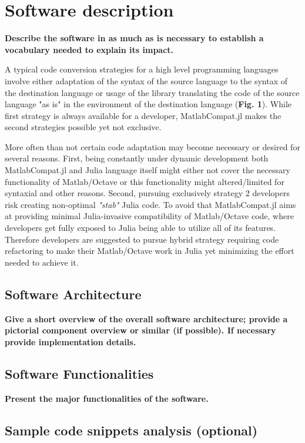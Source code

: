 \section{Software description}
\label{} 

\textbf{Describe the software in as much as is necessary to establish a vocabulary needed to explain its impact. }

A typical code conversion strategies for a high level programming languages involve either adaptation of the syntax of the source language to the syntax of the destination language or usage of the library translating the code of the source language "as is" in the environment of the destination language (\textbf{Fig. 1}). While first strategy is always available for a developer, MatlabCompat.jl makes the second strategies possible yet not exclusive.

More often than not certain code adaptation may become necessary or desired for several reasons. First, being constantly under dynamic development both MatlabCompat.jl and Julia language itself might either not cover the necessary functionality of Matlab/Octave or this functionality might altered/limited for syntaxial and other reasons. Second, pursuing exclusively strategy 2 developers risk creating non-optimal \textit{"stab"} Julia code. To avoid that MatlabCompat.jl aims at providing minimal Julia-invasive compatibility of Matlab/Octave code, where developers get fully exposed to Julia being able to utilize all of its features. Therefore developers are suggested to pursue hybrid strategy requiring code refactoring to make their Matlab/Octave work in Julia yet minimizing the effort needed to achieve it.

\subsection{Software Architecture}
\label{} 

\textbf{Give a short overview of the overall software architecture; provide a pictorial component overview or similar (if possible). If necessary provide implementation details.}


\subsection{Software Functionalities}
\label{} 

\textbf{Present the major functionalities of the software.}


\subsection{Sample code snippets analysis (optional)}
\label{} 
  
  
  
  
  